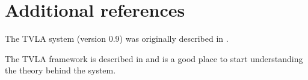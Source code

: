 \section{Additional references}

The TVLA system (version 0.9) was originally described in
\cite{kn:TalSAS00}.

The TVLA framework is described in \cite{TOPLAS:SRW02} and is a
good place to start understanding the theory behind the system.
